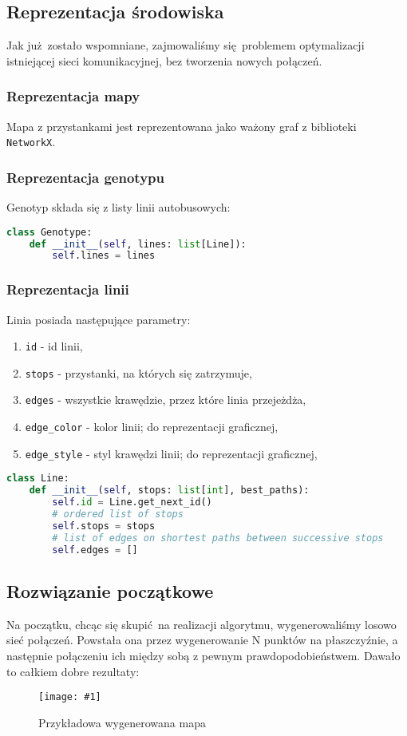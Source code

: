 \documentclass[12pt,a4paper]{article}
\newcommand{\imgcustomsize}[3]{
	\begin{figure}[H]
		\centering
		\texttt{[image: \#1]}
		\caption{#2}
	\end{figure}
}
\newcommand{\img}[2]{\imgcustomsize{#1}{#2}{0.8}}
\begin{document}
\subsection{Reprezentacja środowiska}
Jak już zostało wspomniane, zajmowaliśmy się problemem optymalizacji istniejącej sieci komunikacyjnej, bez tworzenia nowych połączeń.

\subsubsection{Reprezentacja mapy}
Mapa z przystankami jest reprezentowana jako ważony graf z biblioteki \lstinline{NetworkX}.

\subsubsection{Reprezentacja genotypu}
Genotyp składa się z listy linii autobusowych:
\begin{lstlisting}[language=Python]
class Genotype:
    def __init__(self, lines: list[Line]):
        self.lines = lines
\end{lstlisting}

\subsubsection{Reprezentacja linii}
Linia posiada następujące parametry:
\begin{enumerate}
    \item \lstinline{id} - id linii,
    \item \lstinline{stops} - przystanki, na których się zatrzymuje,
    \item \lstinline{edges} - wszystkie krawędzie, przez które linia przejeżdża,
    \item \lstinline{edge_color} - kolor linii; do reprezentacji graficznej,
    \item \lstinline{edge_style} - styl krawędzi linii; do reprezentacji graficznej,
\end{enumerate}


\begin{lstlisting}[language=Python]
class Line:
    def __init__(self, stops: list[int], best_paths):
        self.id = Line.get_next_id()
        # ordered list of stops
        self.stops = stops
        # list of edges on shortest paths between successive stops
        self.edges = []
\end{lstlisting}

\subsection{Rozwiązanie początkowe}
Na początku, chcąc się skupić na realizacji algorytmu, wygenerowaliśmy losowo sieć połączeń. Powstała ona przez wygenerowanie N punktów na płaszczyźnie, a następnie połączeniu ich między sobą z pewnym prawdopodobieństwem. Dawało to całkiem dobre rezultaty:
\img{map_seed_46}{Przykładowa wygenerowana mapa}
\end{document}
